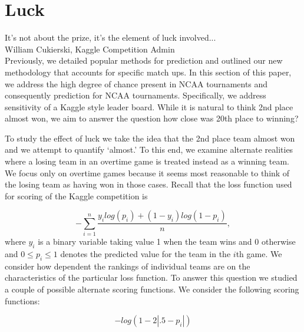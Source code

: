 
\section{Luck}
\noindent It's not about the prize, it's the element of luck involved...\\
\noindent  William Cukierski, Kaggle Competition Admin \\

Previously, we detailed popular methods for prediction and outlined our new methodology that accounts for specific match ups. In this section of this paper, we address the high degree of chance present in NCAA tournaments and consequently prediction for NCAA tournaments.  Specifically, we address sensitivity of a Kaggle style leader board. While it is natural to think 2nd place almost won, we aim to answer the question how close was 20th place to winning? 


To study the effect of luck we take the idea that the 2nd place team almost won and we attempt to quantify `almost.' To this end, we examine alternate realities where a losing team in an overtime game is treated instead as a winning team. We focus only on overtime games because it seems most reasonable to think of the losing team as having won in those cases. Recall that the loss function used for scoring of the Kaggle competition is

\begin{equation}
-\sum_{i=1}^n\frac{y_ilog(p_i)+ (1-y_i)log(1-p_i)}{n},
\end{equation}
where $y_i$ is a binary variable taking value 1 when the team wins and 0 otherwise and $0 \leq p_i \leq 1$ denotes the predicted value for the team in the $i$th game. We consider how dependent the rankings of individual teams are on the characteristics of the particular loss function. To answer this question we studied a couple of possible alternate scoring functions. We consider the following scoring functions: 
 
\begin{equation}\label{eqn:first_score_function}
-log(1-2|.5-p_i|)
\end{equation} 

